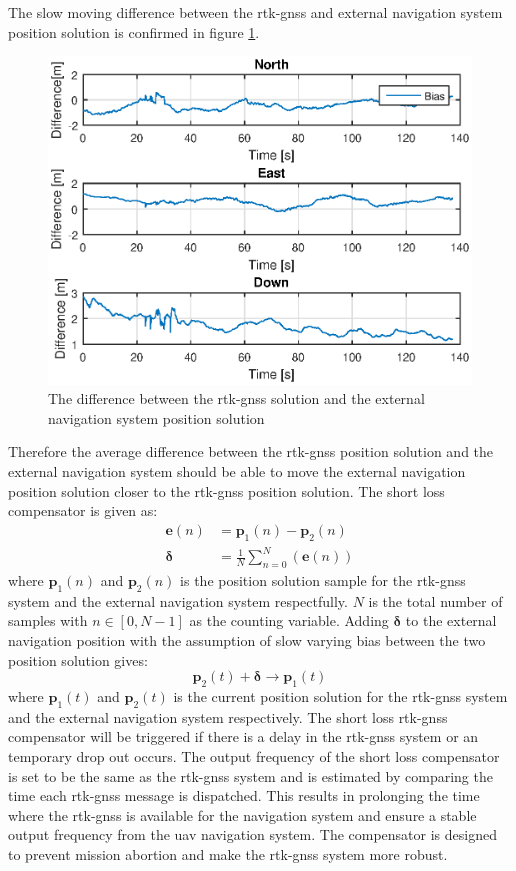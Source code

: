 The slow moving difference between the \gls{rtk-gnss} and external navigation system position solution is confirmed in figure \ref{Fig:RtkExtDiff}.
\begin{figure}[H]
\centering
\includegraphics[scale=0.8]{figs/Experiment/biasShow.eps}
\caption{The difference between the \gls{rtk-gnss} solution and the external navigation system position solution}
\label{Fig:RtkExtDiff}
\end{figure}
Therefore the average difference between the \gls{rtk-gnss} position solution and the external navigation system should be able to move the external navigation position solution closer to the \gls{rtk-gnss} position solution. The short loss compensator is given as:
\begin{align}
\mathbf{e}(n) &= \mathbf{p}_1(n) - \mathbf{p}_2(n)\\
\mathbf{\delta} &= \frac{1}{N}\sum_{n=0}^N(\mathbf{e}(n))
\end{align}
where $\mathbf{p}_1(n)$ and $\mathbf{p}_2(n)$ is the position solution sample for the \gls{rtk-gnss} system and the external navigation system respectfully. $N$ is the total number of samples with $n\in [0,N-1]$ as the counting variable. Adding $\mathbf{\delta}$ to the external navigation position with the assumption of slow varying bias between the two position solution gives:
\begin{equation}
\mathbf{p}_2(t) + \mathbf{\delta} \rightarrow \mathbf{p}_1(t)
\end{equation}
where $\mathbf{p}_1(t)$ and $\mathbf{p}_2(t)$ is the current position solution for the \gls{rtk-gnss} system and the external navigation system respectively. The short loss \gls{rtk-gnss} compensator will be triggered if there is a delay in the \gls{rtk-gnss} system or an temporary drop out occurs. The output frequency of the short loss compensator is set to be the same as the \gls{rtk-gnss} system and is estimated by comparing the time each \gls{rtk-gnss} message is dispatched. This results in prolonging the time where the \gls{rtk-gnss} is available for the navigation system and ensure a stable output frequency from the \gls{uav} navigation system. The compensator is designed to prevent mission abortion and make the \gls{rtk-gnss} system more robust.
